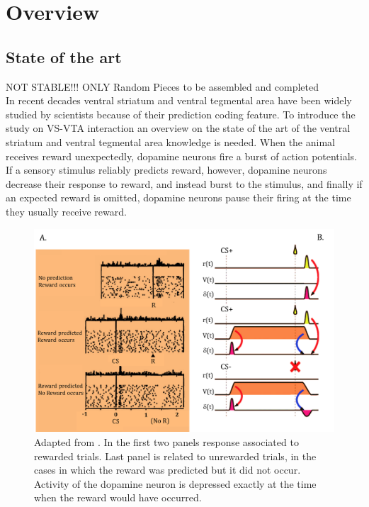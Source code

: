 \chapter{Overview}
\label{chap:Overview}
\section{State of the art}
\label{sec:StateArt}
{\color{red}NOT STABLE!!! ONLY Random Pieces to be assembled and completed}\\
 In recent decades ventral striatum and ventral tegmental area have been widely studied by scientists because of their prediction coding feature.
 To introduce the study on VS-VTA interaction an overview on the state of the art of the ventral striatum and ventral tegmental area knowledge is needed.
 When the animal receives reward unexpectedly, dopamine neurons fire a burst of action potentials. If a sensory stimulus reliably predicts reward, however, dopamine neurons decrease their response to reward, and instead burst to the stimulus, and finally if an expected reward is omitted, dopamine neurons pause their firing at the time they usually receive reward.\\
\begin{figure}
    \centering
    \includegraphics[scale=0.5]{figures/RewardDoyaRLSUM.png}
    \caption{Adapted from \cite{Doya}. In the first two panels response associated to rewarded trials. Last panel is related to unrewarded trials, in the cases in which the reward was predicted but it did not occur. Activity of the dopamine neuron is depressed exactly at the time when the reward would have occurred.}
    \label{fig:RewardDoya}
\end{figure}
